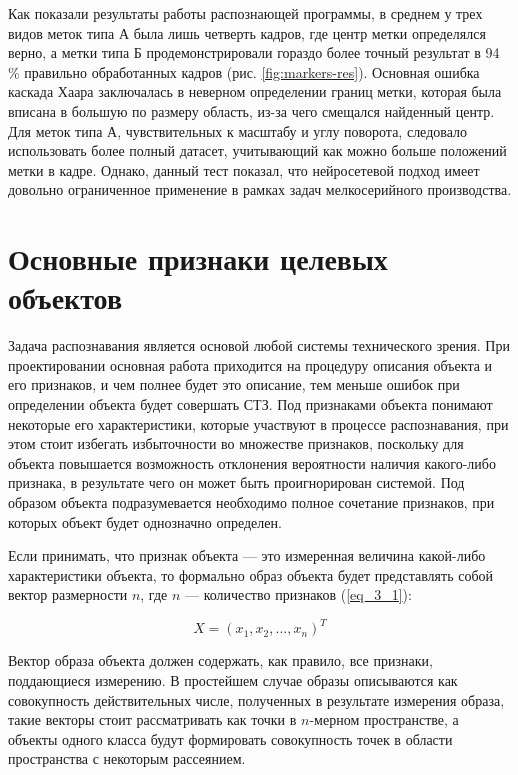 Как показали результаты работы распознающей программы, в среднем у трех видов меток типа А была лишь четверть кадров, где центр метки определялся верно, а метки типа Б продемонстрировали гораздо более точный результат в 94 \% правильно обработанных кадров (рис. \cref{fig:markers-res}). Основная ошибка каскада Хаара заключалась в неверном определении границ метки, которая была вписана в большую по размеру область, из-за чего смещался найденный центр. Для меток типа А, чувствительных к масштабу и углу поворота, следовало использовать более полный датасет, учитывающий как можно больше положений метки в кадре. Однако, данный тест показал, что нейросетевой подход имеет довольно ограниченное применение в рамках задач мелкосерийного производства.

\section{Основные признаки целевых объектов} \label{sect3_2}

Задача распознавания является основой любой системы технического зрения. При проектировании основная работа приходится на процедуру описания объекта и его признаков, и чем полнее будет это описание, тем меньше ошибок при определении объекта будет совершать СТЗ. Под признаками объекта понимают некоторые его характеристики, которые участвуют в процессе распознавания, при этом стоит избегать избыточности во множестве признаков, поскольку для объекта повышается возможность отклонения вероятности наличия какого-либо признака, в результате чего он может быть проигнорирован системой. Под образом объекта подразумевается необходимо полное сочетание признаков, при которых объект будет однозначно определен.

Если принимать, что признак объекта --- это измеренная величина какой-либо характеристики объекта, то формально образ объекта будет представлять собой вектор размерности $n$, где $n$ --- количество признаков (\ref{eq_3_1}):

\begin{equation}
X = (x_1, x_2, ..., x_n)^T
\label{eq_3_1}
\end{equation}

Вектор образа объекта должен содержать, как правило, все признаки, поддающиеся измерению. В простейшем случае образы описываются как совокупность действительных числе, полученных в результате измерения образа, такие векторы стоит рассматривать как точки в $n$-мерном пространстве, а объекты одного класса будут формировать совокупность точек в области пространства с некоторым рассеянием.

